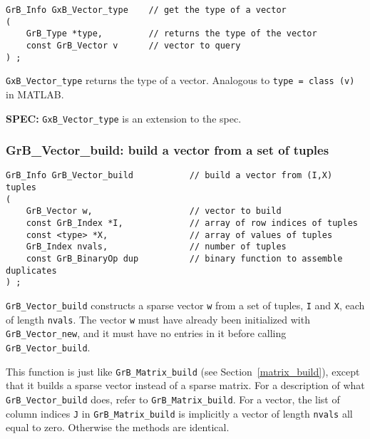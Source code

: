 \documentclass[12pt]{article}
\begin{document}
\begin{mdframed}[userdefinedwidth=6in]
{\footnotesize
\begin{verbatim}
GrB_Info GxB_Vector_type    // get the type of a vector
(
    GrB_Type *type,         // returns the type of the vector
    const GrB_Vector v      // vector to query
) ;
\end{verbatim}
} \end{mdframed}

\verb'GxB_Vector_type' returns the type of a vector.  Analogous to
\verb'type = class (v)' in MATLAB.

\begin{spec}
{\bf SPEC:} \verb'GxB_Vector_type' is an extension to the spec.
\end{spec}

\newpage
\subsubsection{{\sf GrB\_Vector\_build:}         build a vector from a set of tuples}
\label{vector_build}

\begin{mdframed}[userdefinedwidth=6in]
{\footnotesize
\begin{verbatim}
GrB_Info GrB_Vector_build           // build a vector from (I,X) tuples
(
    GrB_Vector w,                   // vector to build
    const GrB_Index *I,             // array of row indices of tuples
    const <type> *X,                // array of values of tuples
    GrB_Index nvals,                // number of tuples
    const GrB_BinaryOp dup          // binary function to assemble duplicates
) ;
\end{verbatim}
} \end{mdframed}

\verb'GrB_Vector_build' constructs a sparse vector \verb'w' from a set of
tuples, \verb'I' and \verb'X', each of length \verb'nvals'.  The vector
\verb'w' must have already been initialized with \verb'GrB_Vector_new', and it
must have no entries in it before calling \verb'GrB_Vector_build'.

This function is just like \verb'GrB_Matrix_build' (see
Section~\ref{matrix_build}), except that it builds a sparse vector instead of a
sparse matrix.  For a description of what \verb'GrB_Vector_build' does, refer
to \verb'GrB_Matrix_build'.  For a vector, the list of column indices \verb'J'
in \verb'GrB_Matrix_build' is implicitly a vector of length \verb'nvals' all
equal to zero.  Otherwise the methods are identical.
\end{document}
